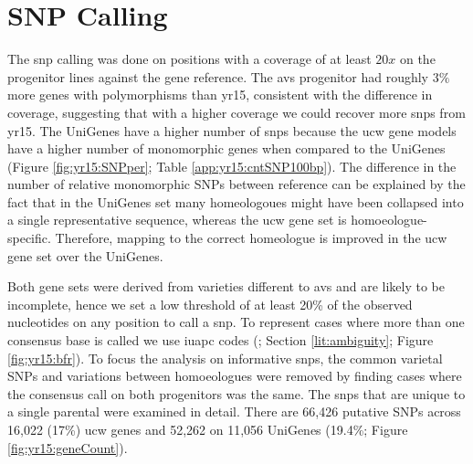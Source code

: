 \section{SNP Calling}
\label{yr15:snpCalling}

The \gls{snp} calling was done on positions with a coverage of at least $20x$ on the progenitor lines against the gene reference. The \gls{avs} progenitor had roughly $3\%$ more genes with polymorphisms than \gls{yr15}, consistent with the difference in coverage, suggesting that with a higher coverage we could recover more \gls{snp}s from \gls{yr15}.
The UniGenes have a higher number of \gls{snp}s because the \gls{ucw} gene models have a higher number of monomorphic genes when compared to the UniGenes (Figure \ref{fig:yr15:SNPper}; Table \ref{app:yr15:cntSNP100bp}). 
The difference in the number of relative monomorphic SNPs between reference can be explained by the fact that in the UniGenes set many homeologoues might have been collapsed into a single representative sequence, whereas the \acrshort{ucw} gene set is homoeologue-specific.
Therefore, mapping to the correct homeologue is improved in the \acrshort{ucw} gene set over the UniGenes.





Both gene sets were derived from varieties different to \gls{avs} and are likely to be incomplete, hence we set a low threshold of at least 20\% of the observed nucleotides on any position to call a \gls{snp}. 
To represent cases where more than one consensus base is called we use \gls{iuapc} codes (\citet{Cornish-Bowden1985}; Section \ref{lit:ambiguity}; Figure \ref{fig:yr15:bfr}).  
To focus the analysis on informative \gls{snp}s, the common varietal SNPs and variations between homoeologues were removed by finding cases where the consensus call on both progenitors was the same. 
The \gls{snp}s that are unique to a single parental were examined in detail. 
There are 66,426 putative SNPs across 16,022 (17\%) \gls{ucw} genes and 52,262  on 11,056 UniGenes (19.4\%; Figure \ref{fig:yr15:geneCount}).  

